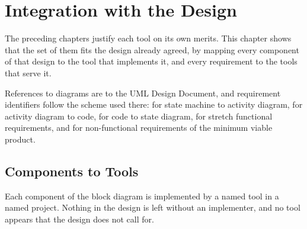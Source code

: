 \chapter{Integration with the Design}
\label{ch:integration}

The preceding chapters justify each tool on its own merits. This chapter shows
that the set of them fits the design already agreed, by mapping every component
of that design to the tool that implements it, and every requirement to the tools
that serve it.

References to diagrams are to the UML Design Document, and requirement
identifiers follow the scheme used there:  for state machine to activity
diagram,  for activity diagram to code,  for code to state
diagram,  for stretch functional requirements, and  for
non-functional requirements of the minimum viable product.

\section{Components to Tools}

Each component of the block diagram is implemented by a named tool in a named
project. Nothing in the design is left without an implementer, and no tool
appears that the design does not call for.

